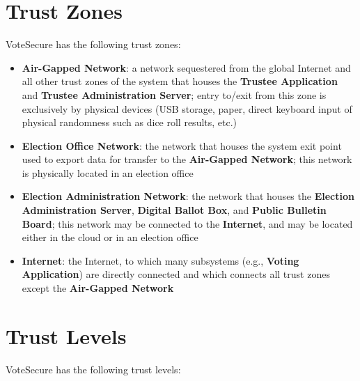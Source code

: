 \documentclass[10pt,letterpaper]{article}
\begin{document}
\section{Trust Zones}

VoteSecure has the following trust zones:

\begin{itemize}

    \item \textbf{Air-Gapped Network}: a network sequestered from the global Internet and all other trust zones of the system that houses the \textbf{Trustee Application} and \textbf{Trustee Administration Server}; entry to/exit from this zone is exclusively by physical devices (USB storage, paper, direct keyboard input of physical randomness such as dice roll results, etc.)

    \item \textbf{Election Office Network}: the network that houses the system exit point used to export data for transfer to the \textbf{Air-Gapped Network}; this network is physically located in an election office

    \item \textbf{Election Administration Network}: the network that houses the \textbf{Election Administration Server}, \textbf{Digital Ballot Box}, and \textbf{Public Bulletin Board}; this network may be connected to the \textbf{Internet}, and may be located either in the cloud or in an election office

    \item \textbf{Internet}: the Internet, to which many subsystems (e.g., \textbf{Voting Application}) are directly connected and which connects all trust zones except the \textbf{Air-Gapped Network}

\end{itemize}

\section{Trust Levels}
VoteSecure has the following trust levels:
\end{document}
